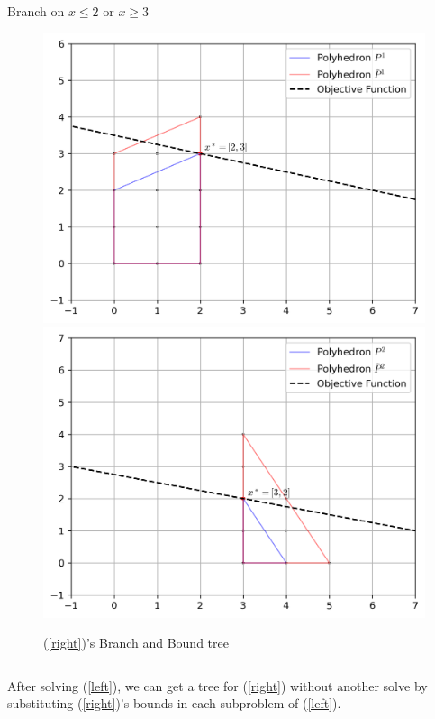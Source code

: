 \documentclass{beamer}
\begin{document}
\begin{frame}[t]
\begin{columns}[T]
\begin{column}{0.45\textwidth}
\begin{figure}[h]
{					}
					\label{p:root_prime}
				\end{figure}
				\centering
				Branch on $ x \leq 2 $ or $ x \geq 3 $
				\begin{figure}[]
					\centering
					\includegraphics[width=.45\textwidth]{P1_prime.png}
					\hfill
					\includegraphics[width=.45\textwidth]{P2_prime.png}
					\captionsetup{font=footnotesize,labelfont=footnotesize}
					\caption{(\ref{right})'s Branch and Bound tree}
					\label{p:after}
				\end{figure}
			\end{column}
		\end{columns}
		\vspace{-.25cm}
		\begin{block}{}
			After solving (\ref{left}), we can get a tree for (\ref{right}) without another solve by substituting (\ref{right})'s bounds in each subproblem of (\ref{left}).
		\end{block}
		\normalsize
	\end{frame}
\end{document}
